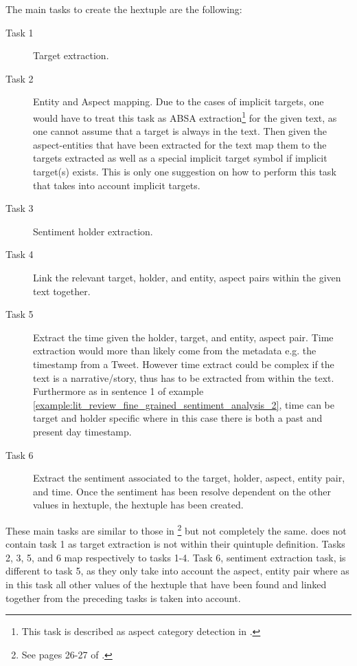 The main tasks to create the hextuple are the following:
\begin{description}
    \item[Task 1] Target extraction.
    \item[Task 2] Entity and Aspect mapping. Due to the cases of implicit targets, one would have to treat this task as ABSA extraction\footnote{This task is described as aspect category detection in \citet{pontiki-etal-2016-semeval}.} for the given text, as one cannot assume that a target is always in the text. Then given the aspect-entities that have been extracted for the text map them to the targets extracted as well as a special implicit target symbol if implicit target(s) exists. This is only one suggestion on how to perform this task that takes into account implicit targets.
    \item[Task 3] Sentiment holder extraction.
    \item[Task 4] Link the relevant target, holder, and entity, aspect pairs within the given text together.
    \item[Task 5] Extract the time given the holder, target, and entity, aspect pair. Time extraction would more than likely come from the metadata e.g. the timestamp from a Tweet. However time extract could be complex if the text is a narrative/story, thus has to be extracted from within the text. Furthermore as in sentence 1 of example \ref{example:lit_review_fine_grained_sentiment_analysis_2}, time can be target and holder specific where in this case there is both a past and present day timestamp.
    \item[Task 6] Extract the sentiment associated to the target, holder, aspect, entity pair, and time. Once the sentiment has been resolve dependent on the other values in hextuple, the hextuple has been created. 
\end{description}

These main tasks are similar to those in \citet{liu2015sentiment}\footnote{See pages 26-27 of \citet{liu2015sentiment}.} but not completely the same. \citet{liu2015sentiment} does not contain task 1 as target extraction is not within their quintuple definition. Tasks 2, 3, 5, and 6 map respectively to \citet{liu2015sentiment} tasks 1-4. Task 6, sentiment extraction task, is different to \citet{liu2015sentiment} task 5, as they only take into account the aspect, entity pair where as in this task all other values of the hextuple that have been found and linked together from the preceding tasks is taken into account.

